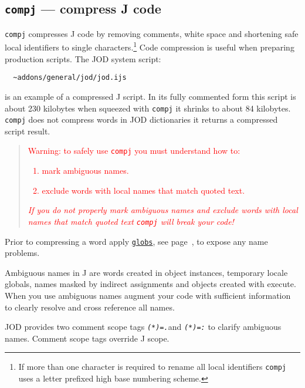 \subsection{\texttt{compj} --- compress J code}

  \texttt{compj} compresses J code by
  removing comments, white space and shortening safe local identifiers to single
  characters.\footnote{If more than one character is required to rename all
  local identifiers \texttt{compj} uses a letter prefixed high base numbering scheme. }
  Code compression is useful when preparing production scripts. The
  JOD system script:
  
\begin{verbatim}
  ~addons/general/jod/jod.ijs
\end{verbatim}

  is an example of a compressed J script. In its fully commented
  form this script is about 230 kilobytes when squeezed with
  \texttt{compj} it shrinks to about 84 kilobytes.
  \texttt{compj} does not compress words in JOD
  dictionaries it returns a compressed script result.
  
\begin{quotation}
 \noindent\textcolor{red}{Warning: to safely use
	  \texttt{compj} you must understand how to:
     \begin{enumerate} 
      \item mark ambiguous names.
      \item exclude words with local names that
        match quoted text. 
     \end{enumerate}
	  \emph{If you do not properly mark ambiguous names and exclude words
     with local names that match quoted text 
    \texttt{compj} will break your code!}}
\end{quotation}
  
  Prior to compressing a word apply \hyperlink{il:globs}{\texttt{globs}}, 
  see page~\pageref{ss:globs}, to expose any name problems.

  Ambiguous names in J are words created in object instances,
  temporary locale globals, names masked by indirect assignments and objects
  created with execute. When you use ambiguous names augment your code with
  sufficient information to clearly resolve and cross reference
   all names. 
  
  JOD provides two comment scope tags
   \textcolor{CodeComment}{\texttt{\textsl{(*)=.}}}and
  \textcolor{CodeComment}{\texttt{\textsl{(*)=:}}} to clarify ambiguous names.  Comment
  scope tags override J scope.  

